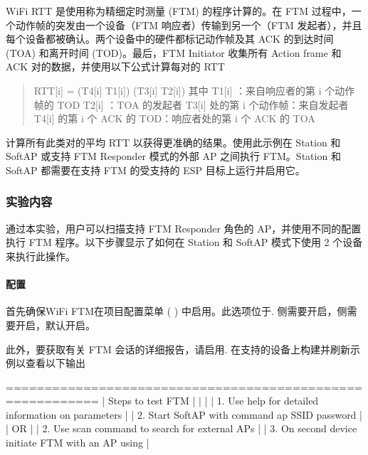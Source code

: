 \documentclass[a4paper,12pt,english]{sphinxmanual}
\begin{document}
{{\sphinxAtStartPar
Wi\sphinxhyphen{}Fi RTT 是使用称为精细定时测量 (FTM) 的程序计算的。在 FTM 过程中，一个动作帧的突发由一个设备（FTM 响应者）传输到另一个（FTM 发起者），并且每个设备都被确认。两个设备中的硬件都标记动作帧及其 ACK 的到达时间 (TOA) 和离开时间 (TOD)。最后，FTM Initiator 收集所有 Action frame 和 ACK 对的数据，并使用以下公式计算每对的 RTT \sphinxhyphen{}
\begin{quote}

\sphinxAtStartPar
RTT{[}i{]} = (T4{[}i{]} \sphinxhyphen{} T1{[}i{]}) \sphinxhyphen{} (T3{[}i{]} \sphinxhyphen{} T2{[}i{]}) 其中 T1{[}i{]} ：来自响应者的第 i 个动作帧的 TOD T2{[}i{]} ：TOA 的发起者 T3{[}i{]} 处的第 i 个动作帧：来自发起者 T4{[}i{]} 的第 i 个 ACK 的 TOD：响应者处的第 i 个 ACK 的 TOA
\end{quote}

\sphinxAtStartPar
计算所有此类对的平均 RTT 以获得更准确的结果。使用此示例在 Station 和 SoftAP 或支持 FTM Responder 模式的外部 AP 之间执行 FTM。Station 和 SoftAP 都需要在支持 FTM 的受支持的 ESP 目标上运行并启用它。


\subsubsection{实验内容}
\label{\detokenize{exp-esp32/wifi/ftm:id2}}
\sphinxAtStartPar
通过本实验，用户可以扫描支持 FTM Responder 角色的 AP，并使用不同的配置执行 FTM 程序。以下步骤显示了如何在 Station 和 SoftAP 模式下使用 2 个设备来执行此操作。


\paragraph{配置}
\label{\detokenize{exp-esp32/wifi/ftm:id3}}
\sphinxAtStartPar
首先确保WiFi FTM在项目配置菜单 ( ) 中启用。此选项位于. 侧需要开启，侧需要开启，默认开启。

\sphinxAtStartPar
此外，要获取有关 FTM 会话的详细报告，请启用. 在支持的设备上构建并刷新示例以查看以下输出 \sphinxhyphen{}

\begin{sphinxVerbatim}[commandchars=\\\{\}]
 ==========================================================
 |                      Steps to test FTM                 |
 |                                                        |
 |  1. Use \PYGZsq{}help\PYGZsq{} for detailed information on parameters  |
 |  2. Start SoftAP with command \PYGZsq{}ap \PYGZlt{}SSID\PYGZgt{} \PYGZlt{}password\PYGZgt{}\PYGZsq{}   |
 |                          OR                            |
 |  2. Use \PYGZsq{}scan\PYGZsq{} command to search for external AP\PYGZsq{}s     |
 |  3. On second device initiate FTM with an AP using     |


\end{sphinxVerbatim}}}
\end{document}
